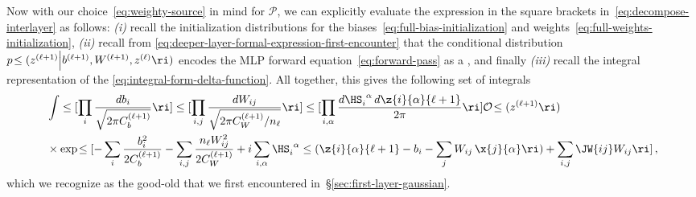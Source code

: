 Now with our choice~\eqref{eq:weighty-source} 
in mind for $\mathcal{P}$, we can explicitly evaluate the expression in the square brackets in~\eqref{eq:decompose-interlayer} as follows: \emph{(i)} recall the initialization distributions for the biases~\eqref{eq:full-bias-initialization} and weights~\eqref{eq:full-weights-initialization}, \emph{(ii)} recall from  \eqref{eq:deeper-layer-formal-expression-first-encounter} that the conditional distribution $p\!\le(z^{(\ell+1)}\Big\vert b^{(\ell+1)},W^{(\ell+1)},z^{(\ell)}\ri)$
encodes the MLP forward equation~\eqref{eq:forward-pass} as a , and finally \emph{(iii)} recall the integral representation of the  \eqref{eq:integral-form-delta-function}.
All together, this gives the following set of integrals
\begin{align}
& \int \le[\prod_{i} \frac{d b_{i}}{\sqrt{2\pi C_b^{(\ell+1)}}}\ri]  \le[\prod_{i,j} \frac{d W_{ij}}{\sqrt{2\pi C_W^{(\ell+1)}/n_{\ell}}} \ri]\le[\prod_{i,\alpha} \frac{d \HS_{i}^{\ \alpha} \,d\z{i}{\alpha}{\ell+1}}{2\pi}\ri] \mathcal{O}\!\le(z^{(\ell+1)}\ri)\, \\
&\times\exp\!\le[-\sum_{i} \frac{b_i^2}{2C_b^{(\ell+1)}}-\sum_{i,j} \frac{n_{\ell} W_{ij}^2}{2C_W^{(\ell+1)}}+i\sum_{i,\alpha} \HS_{i}^{\ \alpha}\le(\z{i}{\alpha}{\ell+1}-b_i-\sum_{j}W_{ij}\,\x{j}{\alpha}\ri)+\sum_{i,j}\JW{ij}W_{ij}\ri]\, ,  \nonumber
\end{align}
which we recognize as the good-old  that we first encountered in~\S\ref{sec:first-layer-gaussian}.

